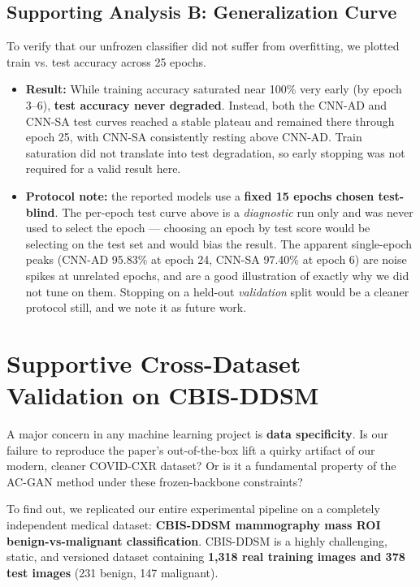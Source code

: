 \documentclass[11pt]{article}
\begin{document}
\subsection{Supporting Analysis B: Generalization Curve}
To verify that our unfrozen classifier did not suffer from overfitting, we plotted train vs. test accuracy across 25 epochs.
\begin{itemize}[nosep, leftmargin=1.5em]
  \item \textbf{Result:} While training accuracy saturated near 100\% very early (by epoch 3--6), \textbf{test accuracy never degraded}. Instead, both the CNN-AD and CNN-SA test curves reached a stable plateau and remained there through epoch 25, with CNN-SA consistently resting above CNN-AD. Train saturation did not translate into test degradation, so early stopping was not required for a valid result here.
  \item \textbf{Protocol note:} the reported models use a \textbf{fixed 15 epochs chosen test-blind}. The per-epoch test curve above is a \emph{diagnostic} run only and was never used to select the epoch --- choosing an epoch by test score would be selecting on the test set and would bias the result. The apparent single-epoch peaks (CNN-AD 95.83\% at epoch 24, CNN-SA 97.40\% at epoch 6) are noise spikes at unrelated epochs, and are a good illustration of exactly why we did not tune on them. Stopping on a held-out \emph{validation} split would be a cleaner protocol still, and we note it as future work.
\end{itemize}


\section{Supportive Cross-Dataset Validation on CBIS-DDSM} \label{sec:cbis_ddsm_validation}
A major concern in any machine learning project is \textbf{data specificity}. Is our failure to reproduce the paper's out-of-the-box lift a quirky artifact of our modern, cleaner COVID-CXR dataset? Or is it a fundamental property of the AC-GAN method under these frozen-backbone constraints?

To find out, we replicated our entire experimental pipeline on a completely independent medical dataset: \textbf{CBIS-DDSM mammography mass ROI benign-vs-malignant classification}. CBIS-DDSM is a highly challenging, static, and versioned dataset containing \textbf{1,318 real training images and 378 test images} (231 benign, 147 malignant).
\end{document}
